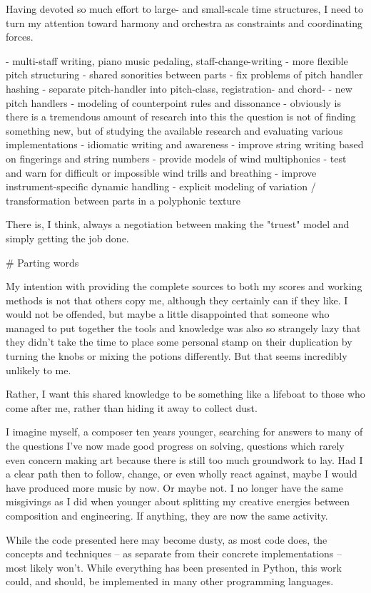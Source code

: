 \begin{markdown}
Having devoted so much effort to large- and small-scale time structures, I need
to turn my attention toward harmony and orchestra as constraints and
coordinating forces.

-   multi-staff writing, piano music pedaling, staff-change-writing
-   more flexible pitch structuring
    -   shared sonorities between parts
    -   fix problems of pitch handler hashing
    -   separate pitch-handler into pitch-class, registration- and chord-
    -   new pitch handlers
    -   modeling of counterpoint rules and dissonance
        - obviously is there is a tremendous amount of research into this
          the question is not of finding something new, but of studying the 
          available research and evaluating various implementations
-   idiomatic writing and awareness
    -   improve string writing based on fingerings and string numbers
    -   provide models of wind multiphonics
    -   test and warn for difficult or impossible wind trills and breathing
    -   improve instrument-specific dynamic handling
-   explicit modeling of variation / transformation between parts in a
    polyphonic texture

There is, I think, always a negotiation between making the "truest" model and
simply getting the job done.

# Parting words

My intention with providing the complete sources to both my scores and working
methods is not that others copy me, although they certainly can if they like. I
would not be offended, but maybe a little disappointed that someone who managed
to put together the tools and knowledge was also so strangely lazy that they
didn't take the time to place some personal stamp on their duplication by
turning the knobs or mixing the potions differently. But that seems incredibly
unlikely to me.

Rather, I want this shared knowledge to be something like a lifeboat to those
who come after me, rather than hiding it away to collect dust.

I imagine myself, a composer ten years younger, searching for answers to many
of the questions I've now made good progress on solving, questions which rarely
even concern making art because there is still too much groundwork to lay. Had
I a clear path then to follow, change, or even wholly react against,
maybe I would have produced more music by now. Or maybe not. I no longer have
the same misgivings as I did when younger about splitting my creative energies
between composition and engineering. If anything, they are now the same
activity.

While the code presented here may become dusty, as most code does, the
concepts and techniques -- as separate from their concrete implementations --
most likely won't. While everything has been presented in Python, this work
could, and should, be implemented in many other programming languages.

\end{markdown}